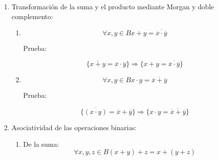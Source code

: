 \documentclass[
]{article}
\begin{document}
\begin{enumerate}
\begin{enumerate}
\begin{enumerate}
\begin{enumerate}
        \[{{{{{({x + y})} + {({\overline{x} \cdot \overline{y}})}} = {{({x + {({\overline{x} \cdot \overline{y}})}})} \cdot {({y + {({\overline{x} \cdot \overline{y}})}})}}} = {{({x + {({\overline{x} \cdot \overline{y}})}})} \cdot {({y + {({\overline{y} \cdot \overline{x}})}})}}} = {1 + 1}} = 1\]
      \item
        \[\forall x,{y \in B}{\overline{x\cdot y} = {\overline{x} + \overline{y}}}\]

        Prueba:

        \[{{{{{({x \cdot y})} + {({\overline{x} + \overline{y}})}} = {{({x + {({\overline{x} + \overline{y}})}})} \cdot {({y + {({\overline{x} + \overline{y}})}})}}} = {{({x + {({\overline{x} + \overline{y}})}})} \cdot {({y + {({\overline{y} + \overline{x}})}})}}} = {1 \cdot 1}} = 1\]

        \[{{{{{({x \cdot y})} \cdot {({\overline{x} + \overline{y}})}} = {{({x \cdot {({\overline{x} + \overline{y}})}})} + {({y \cdot {({\overline{x} + \overline{y}})}})}}} = {{({x \cdot {({\overline{x} + \overline{y}})}})} + {({y \cdot {({\overline{y} + \overline{x}})}})}}} = {0 \cdot 0}} = 0\]
      \end{enumerate}
    \item
      Transformación de la suma y el producto mediante Morgan y doble
      complemento:

      \begin{enumerate}
      \def\labelenumiv{\arabic{enumiv}.}
      \item
        \[\forall x,{y \in B}{{x + y} = \overline{\overline{x}\cdot\overline{y}}}\]

        Prueba:

        \[{\{{\overline{x+y} = {\overline{x} \cdot \overline{y}}}\}}\Rightarrow{\{{{x + y} = \overline{\overline{x}\cdot\overline{y}}}\}}\]
      \item
        \[\forall x,{y \in B}{{x \cdot y} = \overline{\overline{x}+\overline{y}}}\]

        Prueba:

        \[{\{{\overline{({x\cdot y})} = {\overline{x} + \overline{y}}}\}}\Rightarrow{\{{{x \cdot y} = \overline{\overline{x}+\overline{y}}}\}}\]
      \end{enumerate}
    \item
      Asociatividad de las operaciones binarias:

      \begin{enumerate}
      \def\labelenumiv{\arabic{enumiv}.}
      \item
        De la suma:
        \[\forall x,y,{z \in B}{{{({x + y})} + z} = {x + {({y + z})}}}\]


\end{enumerate}
\end{enumerate}
\end{enumerate}
\end{enumerate}
\end{document}
